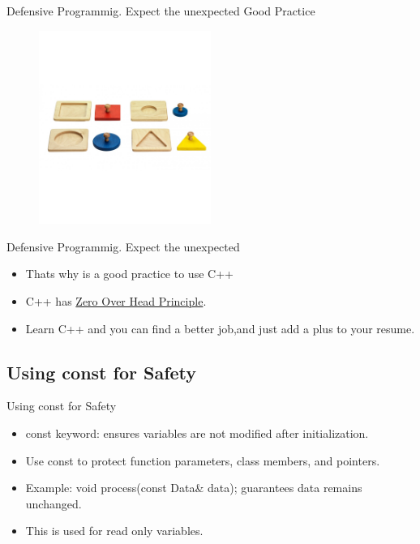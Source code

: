 \documentclass[10pt]{beamer}
\begin{document}
\begin{frame}{Defensive Programmig. Expect the unexpected}
  Good Practice
  \begin{figure}[h]
    \centering
    \includegraphics[width=0.5\textwidth]{figures/GoodDummyProof.png}
    \label{fig:BadDummpyProof}
  \end{figure}
\end{frame}
\begin{frame}{Defensive Programmig. Expect the unexpected}
  \begin{itemize}
    \item Thats why is a good practice to use C++
    \item C++ has \href{https://en.cppreference.com/w/cpp/language/Zero-overhead_principle}{Zero Over Head Principle}.
    \item Learn C++ and you can find a better job,and just add a plus to your resume. 
  \end{itemize}
\end{frame}
\subsection{Using const for Safety}
\begin{frame}{Using const for Safety}
  \begin{itemize}
    \item const keyword: ensures variables are not modified after initialization.
    \item Use const to protect function parameters, class members, and pointers.
    \item Example: void process(const Data\& data); guarantees data remains unchanged.
    \item This is used for read only variables.
  \end{itemize}
\end{frame}
\end{document}

